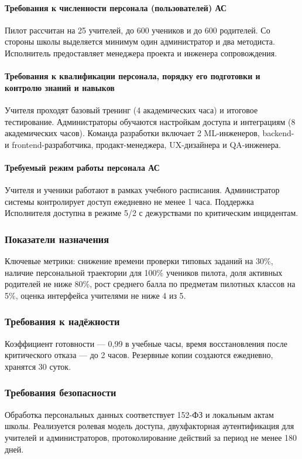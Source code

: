\documentclass[14pt,a4paper]{extarticle}
\begin{document}
\paragraph{Требования к численности персонала (пользователей) АС} Пилот рассчитан на 25 учителей, до 600 учеников и до 600 родителей. Со стороны школы выделяется минимум один администратор и два методиста. Исполнитель предоставляет менеджера проекта и инженера сопровождения.

\paragraph{Требования к квалификации персонала, порядку его подготовки и контролю знаний и навыков} Учителя проходят базовый тренинг (4 академических часа) и итоговое тестирование. Администраторы обучаются настройкам доступа и интеграциям (8 академических часов). Команда разработки включает 2 ML-инженеров, backend- и frontend-разработчика, продакт-менеджера, UX-дизайнера и QA-инженера.

\paragraph{Требуемый режим работы персонала АС} Учителя и ученики работают в рамках учебного расписания. Администратор системы контролирует доступ ежедневно не менее 1 часа. Поддержка Исполнителя доступна в режиме 5/2 с дежурствами по критическим инцидентам.

\subsubsection{Показатели назначения}
Ключевые метрики: снижение времени проверки типовых заданий на 30\%, наличие персональной траектории для 100\% учеников пилота, доля активных родителей не ниже 80\%, рост среднего балла по предметам пилотных классов на 5\%, оценка интерфейса учителями не ниже 4 из 5.

\subsubsection{Требования к надёжности}
Коэффициент готовности — 0,99 в учебные часы, время восстановления после критического отказа — до 2 часов. Резервные копии создаются ежедневно, хранятся 30 суток.

\subsubsection{Требования безопасности}
Обработка персональных данных соответствует 152-ФЗ и локальным актам школы. Реализуется ролевая модель доступа, двухфакторная аутентификация для учителей и администраторов, протоколирование действий за период не менее 180 дней.
\end{document}
